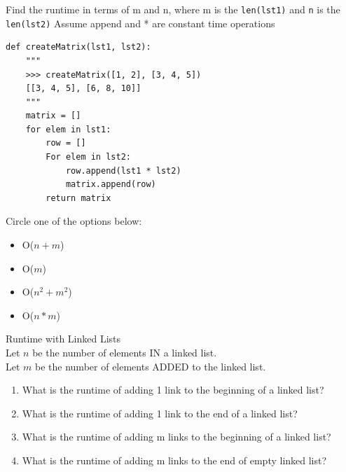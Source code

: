 \documentclass{exam}
\begin{document}
\begin{questions}
\clearpage

\item Find the runtime in terms of m and n, where m is the \texttt{len(lst1)} and \texttt{n} is the \texttt{len(lst2)}
Assume append and * are constant time operations
\begin{lstlisting}
def createMatrix(lst1, lst2): 
    """
    >>> createMatrix([1, 2], [3, 4, 5])
    [[3, 4, 5], [6, 8, 10]]
    """ 
    matrix = []
    for elem in lst1:
        row = []
        For elem in lst2:
            row.append(lst1 * lst2)
            matrix.append(row)
        return matrix
\end{lstlisting}
Circle one of the options below:
\begin{itemize}
\item O($n + m$)
\item O($m$)
\item O($n^2 + m^2$)
\item O($n * m$)
\end{itemize}

\item Runtime with Linked Lists\\
Let $n$ be the number of elements IN a linked list.\\
Let $m$ be the number of elements ADDED to the linked list.
\begin{enumerate}
\item What is the runtime of adding 1 link to the beginning of a linked list?
\vspace{1cm}
\item What is the runtime of adding 1 link to the end of a linked list?
\vspace{1cm}
\item What is the runtime of adding m links to the beginning of a linked list?
\vspace{1cm}
\item What is the runtime of adding m links to the end of empty linked list?
\end{enumerate}

\end{questions}


\end{document}
